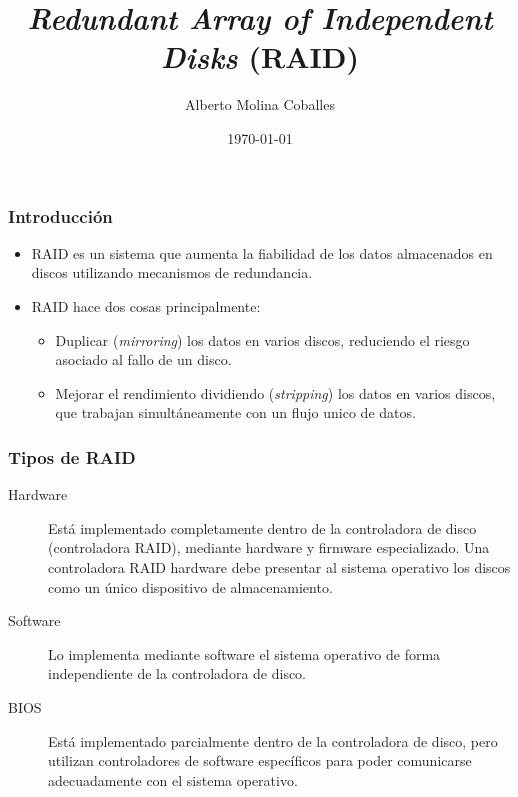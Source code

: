 \documentclass[aspectratio=169]{beamer}
\author{Alberto Molina Coballes}
\title{\emph{Redundant Array of Independent Disks} (RAID)}
\institute{IES Gonzalo Nazareno}
\date{\today}
\begin{document}
\begin{frame}[t,plain]
\titlepage
\end{frame}

\begin{frame}
  \frametitle{Introducción}
  \begin{itemize}
  \item RAID es un sistema que aumenta la fiabilidad de los
    datos almacenados en discos utilizando mecanismos de redundancia.
  \item RAID hace dos cosas principalmente:
    \begin{itemize}
    \item Duplicar (\emph{mirroring}) los datos en varios discos,
      reduciendo el riesgo asociado al fallo de un disco.
    \item Mejorar el rendimiento dividiendo (\emph{stripping}) los
      datos en varios discos, que trabajan simultáneamente con un
      flujo unico de datos.
    \end{itemize}
  \end{itemize}
\end{frame}

\begin{frame}
  \frametitle{Tipos de RAID}
  \begin{description}
  \item[Hardware] Está implementado completamente dentro de la
    controladora de disco (controladora RAID), mediante hardware y
    firmware especializado. Una controladora RAID hardware debe
    presentar al sistema operativo los discos como un único
    dispositivo de almacenamiento.
  \item[Software] Lo implementa mediante software el sistema operativo
    de forma independiente de la controladora de disco.
  \item[BIOS] Está implementado parcialmente dentro de la controladora
    de disco, pero utilizan controladores de software específicos para
    poder comunicarse adecuadamente con el sistema operativo.
  \end{description}
\end{frame}
\end{document}
